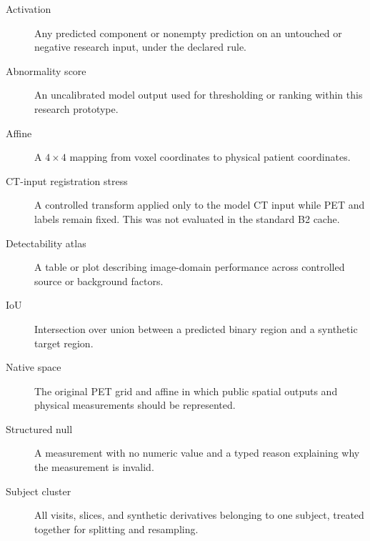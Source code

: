 \documentclass[11pt]{article}
\begin{document}
\begin{description}
  \item[Activation] Any predicted component or nonempty prediction on an untouched or negative research input, under the declared rule.
  \item[Abnormality score] An uncalibrated model output used for thresholding or ranking within this research prototype.
  \item[Affine] A $4 \times 4$ mapping from voxel coordinates to physical patient coordinates.
  \item[CT-input registration stress] A controlled transform applied only to the model CT input while PET and labels remain fixed. This was not evaluated in the standard B2 cache.
  \item[Detectability atlas] A table or plot describing image-domain performance across controlled source or background factors.
  \item[IoU] Intersection over union between a predicted binary region and a synthetic target region.
  \item[Native space] The original PET grid and affine in which public spatial outputs and physical measurements should be represented.
  \item[Structured null] A measurement with no numeric value and a typed reason explaining why the measurement is invalid.
  \item[Subject cluster] All visits, slices, and synthetic derivatives belonging to one subject, treated together for splitting and resampling.
\end{description}
\end{document}
